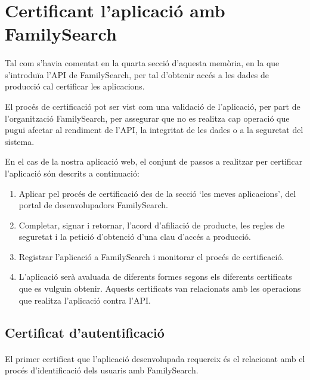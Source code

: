 \section{Certificant l'aplicació amb FamilySearch}\label{section:certification}

    \paragraph{}
    Tal com s'havia comentat en la quarta secció d'aquesta memòria, en la que s'in\-tro\-duïa l'API de FamilySearch, per tal d'obtenir accés a les dades de producció cal certificar les aplicacions.

    El procés de certificació pot ser vist com una validació de l'aplicació, per part de l'organització FamilySearch, per assegurar que no es realitza cap operació que pugui afectar al rendiment de l'API, la integritat de les dades o a la seguretat del sistema.

    En el cas de la nostra aplicació web, el conjunt de passos a realitzar per certificar l'aplicació són descrits a continuació:

    \begin{enumerate}
        \item Aplicar pel procés de certificació des de la secció `les meves aplicacions', del portal de desenvolupadors FamilySearch.
        \item Completar, signar i retornar, l'acord d'afiliació de producte, les regles de seguretat i la petició d'obtenció d'una clau d'accés a producció.
        \item Registrar l'aplicació a FamilySearch i monitorar el procés de certificació.
        \item L'aplicació serà avaluada de diferents formes segons els diferents certificats que es vulguin obtenir. Aquests certificats van relacionats amb les operacions que realitza l'aplicació contra l'API.
    \end{enumerate}


    \subsection{Certificat d'autentificació}

    \paragraph{}
    El primer certificat que l'aplicació desenvolupada requereix és el relacionat amb el procés d'identificació dels usuaris amb FamilySearch.

